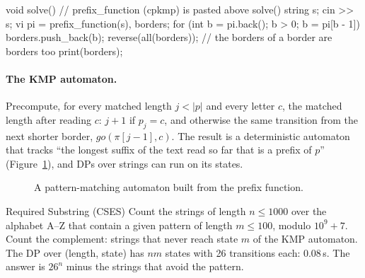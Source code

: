 \begin{code}
void solve() {  // prefix_function (cpkmp) is pasted above solve()
    string s;
    cin >> s;
    vi pi = prefix_function(s), borders;
    for (int b = pi.back(); b > 0; b = pi[b - 1]) borders.push_back(b);
    reverse(all(borders));  // the borders of a border are borders too
    print(borders);
}
\end{code}

\paragraph{The KMP automaton.} Precompute, for every matched length $j < |p|$ and every letter $c$, the matched length after reading $c$:
$j + 1$ if $p_j = c$, and otherwise the same transition from the next shorter border, $\mathit{go}(\pi[j-1], c)$. The result is a
deterministic automaton that tracks ``the longest suffix of the text read so far that is a prefix of $p$'' (Figure~\ref{fig:kmpauto}),
and DPs over strings can run on its states.

\begin{figure}[htbp]
\centering
{}
\caption{A pattern-matching automaton built from the prefix function.}
\label{fig:kmpauto}
\end{figure}

\begin{problem}{Required Substring (CSES)}
Count the strings of length $n \le 1000$ over the alphabet A--Z that contain a given pattern of length $m \le 100$, modulo $10^9 + 7$.
\solution Count the complement: strings that never reach state $m$ of the KMP automaton. The DP over (length, state) has $nm$ states with
26 transitions each: 0.08\,s. The answer is $26^n$ minus the strings that avoid the pattern.
\end{problem}

